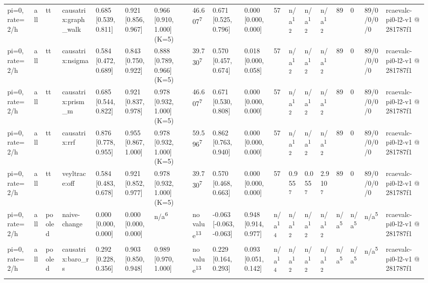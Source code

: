 \begin{table}[t]
\begin{tabular}{llllllllllllllllll}
pi=0, rate=2/h & all & tt & causatrix:graph\_walk & 0.685 [0.539, 0.811] & 0.921 [0.856, 0.967] & 0.966 [0.910, 1.000] (K=5) & 46.607\textsuperscript{7} & 0.671 [0.525, 0.796] & 0.000 [0.000, 0.000] & 57 & n/a\textsuperscript{12} & n/a\textsuperscript{12} & n/a\textsuperscript{12} & 89 & 0 & 89/0/0/0/0 & rcaevalc-pi0-l2-v1 @ 281787f1 \\
pi=0, rate=2/h & all & tt & causatrix:nsigma & 0.584 [0.472, 0.689] & 0.843 [0.750, 0.922] & 0.888 [0.789, 0.966] (K=5) & 39.730\textsuperscript{7} & 0.570 [0.457, 0.674] & 0.018 [0.000, 0.058] & 57 & n/a\textsuperscript{12} & n/a\textsuperscript{12} & n/a\textsuperscript{12} & 89 & 0 & 89/0/0/0/0 & rcaevalc-pi0-l2-v1 @ 281787f1 \\
pi=0, rate=2/h & all & tt & causatrix:prism\_m & 0.685 [0.544, 0.822] & 0.921 [0.837, 0.978] & 0.978 [0.932, 1.000] (K=5) & 46.607\textsuperscript{7} & 0.671 [0.530, 0.808] & 0.000 [0.000, 0.000] & 57 & n/a\textsuperscript{12} & n/a\textsuperscript{12} & n/a\textsuperscript{12} & 89 & 0 & 89/0/0/0/0 & rcaevalc-pi0-l2-v1 @ 281787f1 \\
pi=0, rate=2/h & all & tt & causatrix:rrf & 0.876 [0.778, 0.955] & 0.955 [0.867, 1.000] & 0.978 [0.932, 1.000] (K=5) & 59.596\textsuperscript{7} & 0.862 [0.763, 0.940] & 0.000 [0.000, 0.000] & 57 & n/a\textsuperscript{12} & n/a\textsuperscript{12} & n/a\textsuperscript{12} & 89 & 0 & 89/0/0/0/0 & rcaevalc-pi0-l2-v1 @ 281787f1 \\
pi=0, rate=2/h & all & tt & veyltrace:off & 0.584 [0.483, 0.678] & 0.921 [0.852, 0.977] & 0.978 [0.932, 1.000] (K=5) & 39.730\textsuperscript{7} & 0.570 [0.468, 0.663] & 0.000 [0.000, 0.000] & 57 & 0.955\textsuperscript{7} & 0.055\textsuperscript{7} & 2.910\textsuperscript{7} & 89 & 0 & 89/0/0/0/0 & rcaevalc-pi0-l2-v1 @ 281787f1 \\
pi=0, rate=2/h & all & pooled & naive-change & 0.000 [0.000, 0.000] & 0.000 [0.000, 0.000] & n/a\textsuperscript{6} & no value\textsuperscript{13} & -0.063 [-0.063, -0.063] & 0.948 [0.914, 0.977] & n/a\textsuperscript{14} & n/a\textsuperscript{12} & n/a\textsuperscript{12} & n/a\textsuperscript{12} & n/a\textsuperscript{5} & n/a\textsuperscript{5} & n/a\textsuperscript{5} & rcaevalc-pi0-l2-v1 @ 281787f1 \\
pi=0, rate=2/h & all & pooled & causatrix:baro\_rs & 0.292 [0.228, 0.356] & 0.903 [0.850, 0.948] & 0.989 [0.970, 1.000] & no value\textsuperscript{13} & 0.229 [0.164, 0.293] & 0.093 [0.051, 0.142] & n/a\textsuperscript{14} & n/a\textsuperscript{12} & n/a\textsuperscript{12} & n/a\textsuperscript{12} & n/a\textsuperscript{5} & n/a\textsuperscript{5} & n/a\textsuperscript{5} & rcaevalc-pi0-l2-v1 @ 281787f1 \\

\end{tabular}
\end{table}
